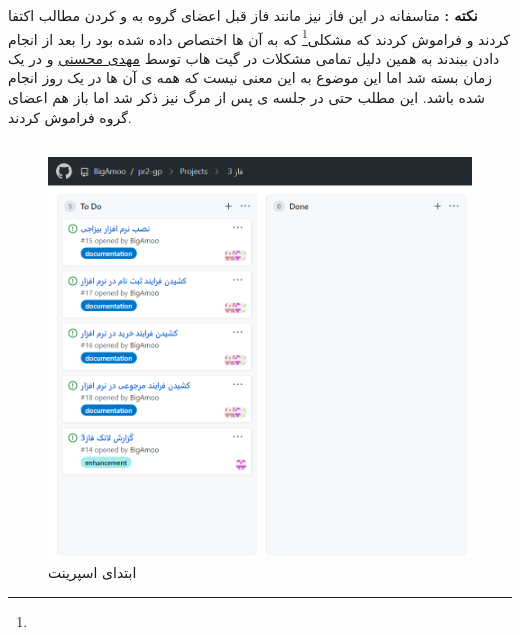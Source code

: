 \documentclass[12pt,a4paper]{article}
\begin{document}
\textbf{نکته :} متاسفانه در این فاز نیز مانند فاز قبل اعضای گروه به  و  کردن مطالب اکتفا کردند و فراموش کردند که مشکلی\footnote{} که به آن ها اختصاص داده شده بود را بعد از انجام دادن ببندند به همین دلیل تمامی مشکلات در گیت هاب توسط \underline{مهدی محسنی} و در یک زمان بسته شد اما این موضوع به این معنی نیست که همه ی آن ها در یک روز انجام شده باشد. این مطلب حتی در جلسه ی پس از مرگ نیز ذکر شد اما باز هم اعضای گروه فراموش کردند.
\pagebreak

	\subsection{} \label{section.report.taskBoard}
	
		\begin{figure}[h!]
			\begin{center}
				\includegraphics[width=14cm]{images/screenshot_7.png}	
			\end{center}
			\caption{ابتدای اسپرینت}
		\end{figure}
		
\end{document}
